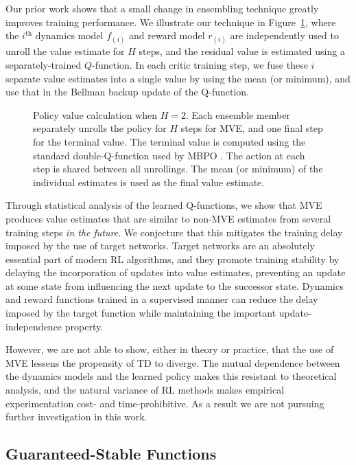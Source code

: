 \documentclass[11pt]{article}
\begin{document}
Our prior work \cite{manek2021mve} shows that a small change in ensembling technique greatly improves training performance. We illustrate our technique in Figure~\ref{fig:policyvalue}, where the $i^\text{th}$ dynamics model $f_{(i)}$ and reward model $r_{(i)}$ are independently used to unroll the value estimate for $H$ steps, and the residual value is estimated using a separately-trained $Q$-function. In each critic training step, we fuse these $i$ separate value estimates into a single value by using the mean (or minimum), and use that in the Bellman backup update of the Q-function.
\begin{figure}
    \centering
    

    \caption{Policy value calculation when $H=2$. Each ensemble member separately unrolls the policy for $H$ steps for MVE, and one final step for the terminal value. The terminal value is computed using the standard double-Q-function used by MBPO \cite{janner2019mbpo}. The action at each step is shared between all unrollings. The mean (or minimum) of the individual estimates is used as the final value estimate. }
    \label{fig:policyvalue}
\end{figure}

Through statistical analysis of the learned Q-functions, we show that MVE produces value estimates that are similar to non-MVE estimates from several training steps \emph{in the future}. We conjecture that this mitigates the training delay imposed by the use of target networks. Target networks \cite[]{mnih2015humanlevel} are an absolutely essential part of modern RL algorithms, and they promote training stability by delaying the incorporation of updates into value estimates, preventing an update at some state from influencing the next update to the successor state. Dynamics and reward functions trained in a supervised manner can reduce the delay imposed by the target function while maintaining the important update-independence property.

However, we are not able to show, either in theory or practice, that the use of MVE lessens the propensity of TD to diverge. The mutual dependence between the dynamics models and the learned policy makes this resistant to theoretical analysis, and the natural variance of RL methods makes empirical experimentation cost- and time-prohibitive. As a result we are not pursuing further investigation in this work.


\subsection{Guaranteed-Stable Functions}
\end{document}
